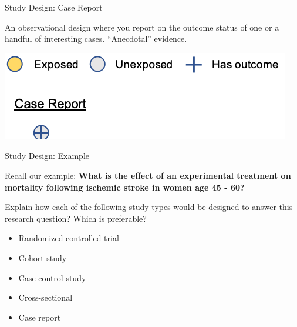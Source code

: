 \documentclass[ignorenonframetext,]{beamer}
\providecommand{\tightlist}{%
  \setlength{\itemsep}{0pt}\setlength{\parskip}{0pt}}
\begin{document}
\begin{frame}{Study Design: Case Report}
\protect\hypertarget{study-design-case-report}{}

An observational design where you report on the outcome status of one or
a handful of interesting cases. ``Anecdotal'' evidence.

\includegraphics{../media/study-design-case.png}

\end{frame}

\begin{frame}{Study Design: Example}
\protect\hypertarget{study-design-example}{}

Recall our example: \textbf{What is the effect of an experimental
treatment on mortality following ischemic stroke in women age 45 - 60?}

Explain how each of the following study types would be designed to
answer this research question? Which is preferable?

\begin{itemize}
\tightlist
\item
  Randomized controlled trial
\item
  Cohort study
\item
  Case control study
\item
  Cross-sectional
\item
  Case report
\end{itemize}

\end{frame}
\end{document}
